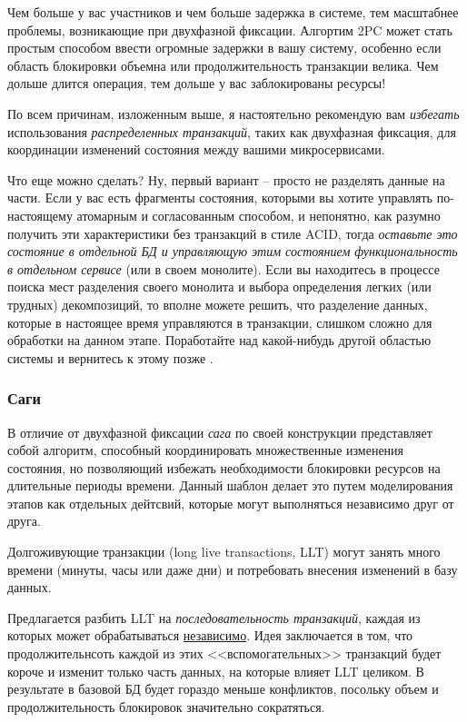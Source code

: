 \documentclass[%
	11pt,
	a4paper,
	utf8,
		]{article}
\begin{document}
{\color{red} Чем больше у вас участников и чем больше задержка в системе, тем масштабнее проблемы, возникающие при двухфазной фиксации. Алгортим 2PC может стать простым способом ввести огромные задержки в вашу систему, особенно если область блокировки объемна или продолжительность транзакции велика. Чем дольше длится операция, тем дольше у вас заблокированы ресурсы!} \cite[]{microservices-2024}

{\color{red}По всем причинам, изложенным выше, я настоятельно рекомендую вам \emph{избегать} использования \emph{распределенных транзакций}, таких как двухфазная фиксация, для координации изменений состояния между вашими микросервисами.}

Что еще можно сделать? Ну, первый вариант -- просто не разделять данные на части. Если у вас есть фрагменты состояния, которыми вы хотите управлять по-настоящему атомарным и согласованным способом, и непонятно, как разумно получить эти характеристики без транзакций в стиле ACID, тогда \emph{оставьте это состояние в отдельной БД и управляющую этим состоянием функциональность в отдельном сервисе} (или в своем монолите). Если вы находитесь в процессе поиска мест разделения своего монолита и выбора определения легких (или трудных) декомпозиций, то вполне можете решить, что разделение данных, которые в настоящее время управляются в транзакции, слишком сложно для обработки на данном этапе. Поработайте над какой-нибудь другой областью системы и вернитесь к этому позже \cite[]{microservices-2024}.

\subsubsection{Саги}

В отличие от двухфазной фиксации \emph{сага} по своей конструкции представляет собой алгоритм, способный координировать множественные изменения состояния, но позволяющий избежать необходимости блокировки ресурсов на длительные периоды времени. Данный шаблон делает это путем моделирования этапов как отдельных дейтсвий, которые могут выполняться независимо друг от друга. 

Долгоживующие транзакции (long live transactions, LLT) могут занять много времени (минуты, часы или даже дни) и потребовать внесения изменений в базу данных.

Предлагается разбить LLT на \emph{последовательность транзакций}, каждая из которых может обрабатываться \underline{независимо}. Идея заключается в том, что продолжительнсоть каждой из этих <<вспомогательных>> транзакций будет короче и изменит только часть данных, на которые влияет LLT целиком. В результате в базовой БД будет гораздо меньше конфликтов, посольку объем и продолжительность блокировок значительно сократяться.
\end{document}
